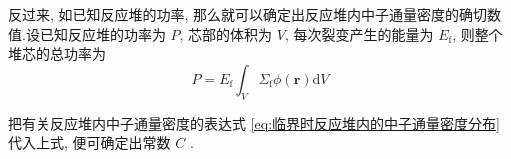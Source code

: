 \documentclass{Sichuan Normal University}
\begin{document}
反过来, 如已知反应堆的功率, 那么就可以确定出反应堆内中子通量密度的确切数值.设已知反应堆的功率为 $P$, 芯部的体积为 $V$, 每次裂变产生的能量为 $E_{\mathrm{f}}$, 则整个堆芯的总功率为
\begin{equation}
P=E_{\mathrm{f}} \int_V \Sigma_{\mathrm{f}} \phi(\boldsymbol{r}) \mathrm{d} V
\end{equation}

把有关反应堆内中子通量密度的表达式 \eqref{eq:临界时反应堆内的中子通量密度分布} 代入上式, 便可确定出常数 $C$ .





\end{document}
